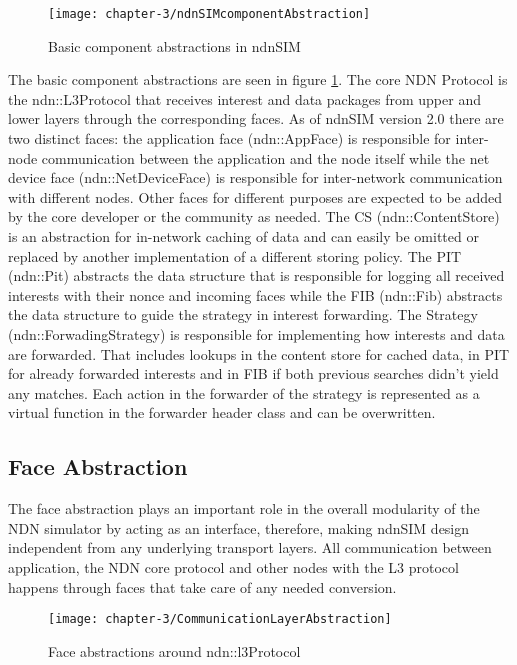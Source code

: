 \begin{figure}[H]
  \centering
  \texttt{[image: chapter-3/ndnSIMcomponentAbstraction]}
  \caption{Basic component abstractions in ndnSIM \cite{afanasyev12}}
  \label{fig:ndnSIMcomponentAbstraction}
\end{figure}

The basic component abstractions are seen in figure \ref{fig:ndnSIMcomponentAbstraction}. The core NDN Protocol is the ndn::L3Protocol that receives interest and data packages from upper and lower layers through the corresponding faces. As of ndnSIM version 2.0 there are two distinct faces: the application face (ndn::AppFace) is responsible for inter-node communication between the application and the node itself while the net device face (ndn::NetDeviceFace) is responsible for inter-network communication with different nodes. Other faces for different purposes are expected to be added by the core developer or the community as needed. The CS (ndn::ContentStore) is an abstraction for in-network caching of data and can easily be omitted or replaced by another implementation of a different storing policy. The PIT (ndn::Pit) abstracts the data structure that is responsible for logging all received interests with their nonce and incoming faces while the FIB (ndn::Fib) abstracts the data structure to guide the strategy in interest forwarding. The Strategy (ndn::ForwadingStrategy) is responsible for implementing how interests and data are forwarded. That includes lookups in the content store for cached data, in PIT for already forwarded interests and in FIB if both previous searches didn't yield any matches. Each action in the forwarder of the strategy is represented as a virtual function in the forwarder header class and can be overwritten.

\subsection{Face Abstraction}

The face abstraction plays an important role in the overall modularity of the NDN simulator by acting as an interface, therefore, making ndnSIM design independent from any underlying transport layers. All communication between application, the NDN core protocol and other nodes with the L3 protocol happens through faces that take care of any needed conversion.

\begin{figure}[H]
  \centering
  \texttt{[image: chapter-3/CommunicationLayerAbstraction]}
  \caption{Face abstractions around ndn::l3Protocol \cite{afanasyev12}}
  \label{fig:CommunicationLayerAbstraction}
\end{figure}

